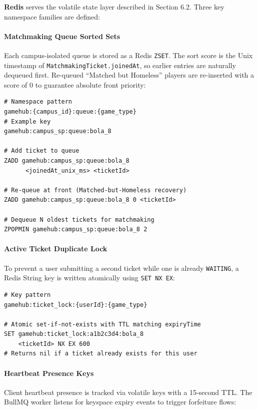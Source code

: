 \documentclass[11pt,a4paper]{report}
\begin{document}
\textbf{Redis} serves the volatile state layer described in Section 6.2. Three key namespace families are defined:

\paragraph{Matchmaking Queue Sorted Sets}
Each campus-isolated queue is stored as a Redis \texttt{ZSET}. The sort score is the Unix timestamp of \texttt{MatchmakingTicket.joinedAt}, so earlier entries are naturally dequeued first. Re-queued ``Matched but Homeless'' players are re-inserted with a score of $0$ to guarantee absolute front priority:

\begin{lstlisting}[caption={Redis queue namespace and operations}]
# Namespace pattern
gamehub:{campus_id}:queue:{game_type}
# Example key
gamehub:campus_sp:queue:bola_8

# Add ticket to queue
ZADD gamehub:campus_sp:queue:bola_8
      <joinedAt_unix_ms> <ticketId>

# Re-queue at front (Matched-but-Homeless recovery)
ZADD gamehub:campus_sp:queue:bola_8 0 <ticketId>

# Dequeue N oldest tickets for matchmaking
ZPOPMIN gamehub:campus_sp:queue:bola_8 2
\end{lstlisting}

\paragraph{Active Ticket Duplicate Lock}
To prevent a user submitting a second ticket while one is already \texttt{WAITING}, a Redis String key is written atomically using \texttt{SET NX EX}:

\begin{lstlisting}[caption={Duplicate ticket guard O(1) lookup}]
# Key pattern
gamehub:ticket_lock:{userId}:{game_type}

# Atomic set-if-not-exists with TTL matching expiryTime
SET gamehub:ticket_lock:a1b2c3d4:bola_8
    <ticketId> NX EX 600
# Returns nil if a ticket already exists for this user
\end{lstlisting}

\paragraph{Heartbeat Presence Keys}
Client heartbeat presence is tracked via volatile keys with a 15-second TTL. The BullMQ worker listens for keyspace expiry events to trigger forfeiture flows:
\end{document}
